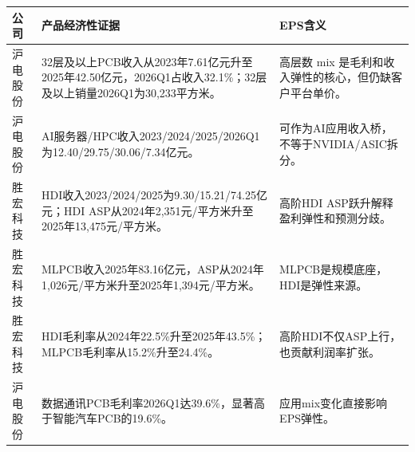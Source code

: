 \begin{exhibitbox}[图表8-15：H股文件中的产品经济性桥]
\footnotesize
\begin{tabularx}{\textwidth}{L{2.2cm}X X}
\toprule
\textbf{公司} & \textbf{产品经济性证据} & \textbf{EPS含义} \\
\midrule
沪电股份 & 32层及以上PCB收入从2023年7.61亿元升至2025年42.50亿元，2026Q1占收入32.1\%；32层及以上销量2026Q1为30,233平方米。 & 高层数 mix 是毛利和收入弹性的核心，但仍缺客户平台单价。 \\
沪电股份 & AI服务器/HPC收入2023/2024/2025/2026Q1为12.40/29.75/30.06/7.34亿元。 & 可作为AI应用收入桥，不等于NVIDIA/ASIC拆分。 \\
胜宏科技 & HDI收入2023/2024/2025为9.30/15.21/74.25亿元；HDI ASP从2024年2,351元/平方米升至2025年13,475元/平方米。 & 高阶HDI ASP跃升解释盈利弹性和预测分歧。 \\
胜宏科技 & MLPCB收入2025年83.16亿元，ASP从2024年1,026元/平方米升至2025年1,394元/平方米。 & MLPCB是规模底座，HDI是弹性来源。 \\
胜宏科技 & HDI毛利率从2024年22.5\%升至2025年43.5\%；MLPCB毛利率从15.2\%升至24.4\%。 & 高阶HDI不仅ASP上行，也贡献利润率扩张。 \\
沪电股份 & 数据通讯PCB毛利率2026Q1达39.6\%，显著高于智能汽车PCB的19.6\%。 & 应用mix变化直接影响EPS弹性。 \\
\bottomrule
\end{tabularx}
\end{exhibitbox}

